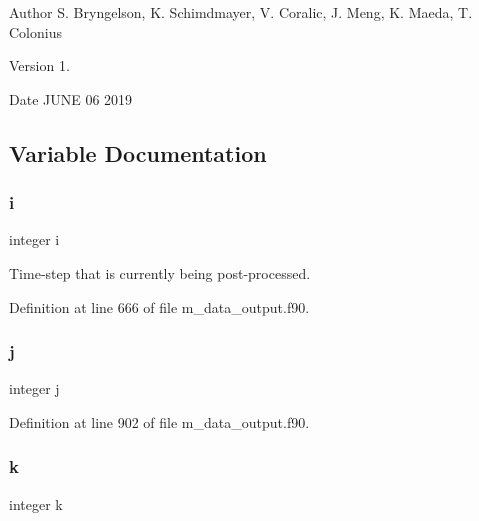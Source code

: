 \begin{DoxyAuthor}{Author}
S. Bryngelson, K. Schimdmayer, V. Coralic, J. Meng, K. Maeda, T. Colonius 
\end{DoxyAuthor}
\begin{DoxyVersion}{Version}
1. 
\end{DoxyVersion}
\begin{DoxyDate}{Date}
J\+U\+NE 06 2019 
\end{DoxyDate}


\subsection{Variable Documentation}
\mbox{\label{m__data__output_8f90_aaea4baed8fd8b780f6938f0dc1fb0f72}} 
\subsubsection{\texorpdfstring{i}{i}}
{\footnotesize\ttfamily integer i}



Time-\/step that is currently being post-\/processed. 



Definition at line 666 of file m\+\_\+data\+\_\+output.\+f90.

\mbox{\label{m__data__output_8f90_aeadbc0ce9b66517f8fde156199772ec1}} 
\subsubsection{\texorpdfstring{j}{j}}
{\footnotesize\ttfamily integer j}



Definition at line 902 of file m\+\_\+data\+\_\+output.\+f90.

\mbox{\label{m__data__output_8f90_af22c486581933c52df7d4aa306382074}} 
\subsubsection{\texorpdfstring{k}{k}}
{\footnotesize\ttfamily integer k}




